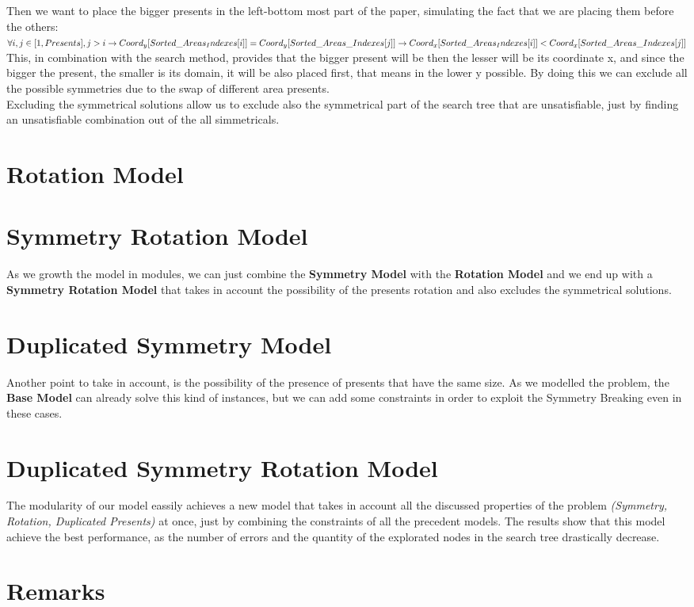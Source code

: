 Then we want to place the bigger presents in the left-bottom most part of the paper, simulating the fact that we are placing them before
the others:\\
$
\forall i, j \in [1, Presents], j > i \rightarrow \\
    Coord_y[Sorted\_Areas_Indexes[i]] = Coord_y[Sorted\_Areas\_Indexes[j]] \rightarrow \\
    Coord_x[Sorted\_Areas_Indexes[i]] < Coord_x[Sorted\_Areas\_Indexes[j]]
$
\\
This, in combination with the search method, provides that the bigger present will be then the lesser will be its coordinate x,
and since the bigger the present, the smaller is its domain, it will be also placed first, that means in the lower y possible.
By doing this we can exclude all the possible symmetries due to the swap of different area presents.\\
Excluding the symmetrical solutions allow us to exclude also the symmetrical part of the search tree that are unsatisfiable, just
by finding an unsatisfiable combination out of the all simmetricals.


\section{Rotation Model}

\section{Symmetry Rotation Model}
As we growth the model in modules, we can just combine the \textbf{Symmetry Model} with the \textbf{Rotation Model} and we end up
with a \textbf{Symmetry Rotation Model} that takes in account the possibility of the presents rotation and also excludes the symmetrical
solutions.

\section{Duplicated Symmetry Model}
Another point to take in account, is the possibility of the presence of presents that have the same size. As we modelled the problem,
the \textbf{Base Model} can already solve this kind of instances, but we can add some constraints in order to exploit the Symmetry Breaking
even in these cases.


\section{Duplicated Symmetry Rotation Model}
The modularity of our model eassily achieves a new model that takes in account all the discussed properties of the problem
\textit{(Symmetry, Rotation, Duplicated Presents)} at once, just by combining the constraints of all the precedent models.
The results show that this model achieve the best performance, as the number of errors and the quantity of the explorated nodes in the
search tree drastically decrease.  

\section{Remarks}

